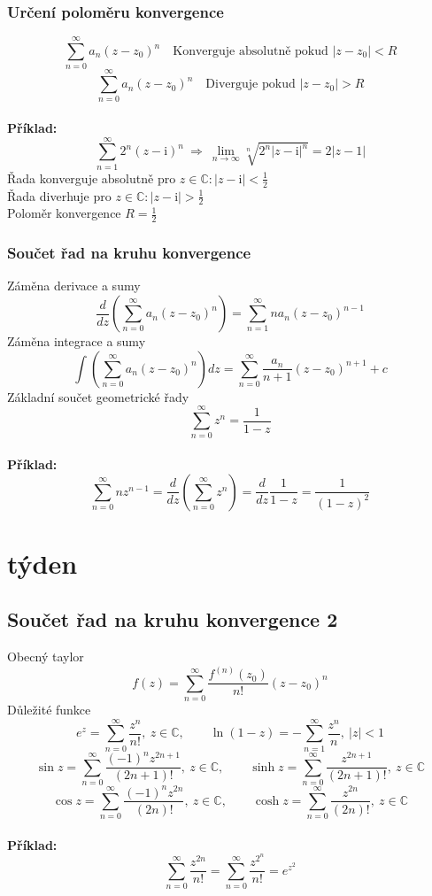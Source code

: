\documentclass{article}
\newcommand{\mi}{\mathrm{i}}
\begin{document}
            \subsubsection*{Určení poloměru konvergence}
            \[\sum_{n=0}^\infty a_n(z-z_0)^n\quad \mbox{Konverguje absolutně pokud }|z-z_0|<R\]
            \[\sum_{n=0}^\infty a_n(z-z_0)^n\quad \mbox{Diverguje pokud }|z-z_0|>R\]
            \\
            {\bf Příklad:}
            \[\sum_{n=1}^{\infty}2^n(z-\mi)^n\:\Rightarrow\:\lim_{n\to\infty}\sqrt[n]{2^n|z-\mi|^n}
            =2|z-1|\]
            Řada konverguje absolutně pro $z\in\mathbb{C}:|z-\mi|<\frac{1}{2}$\\
            Řada diverhuje pro $z\in\mathbb{C}:|z-\mi|>\frac{1}{2}$\\
            Poloměr konvergence $R=\frac{1}{2}$
            \subsubsection*{Součet řad na kruhu konvergence}
                Záměna derivace a sumy
                    \[\frac{d}{dz}\left(\sum_{n=0}^\infty a_n(z-z_0)^n\right)=
                    \sum_{n=1}^\infty na_n(z-z_0)^{n-1}\]
                Záměna integrace a sumy
                    \[\int \left(\sum_{n=0}^{\infty}a_n(z-z_0)^n\right)dz=
                    \sum_{n=0}^{\infty}\frac{a_n}{n+1}(z-z_0)^{n+1}+c\]
                Základní součet geometrické řady
                    \[\sum_{n=0}^{\infty}z^n=\frac{1}{1-z}\]
                \\
                {\bf Příklad:}
                \[\sum_{n=0}^{\infty}nz^{n-1}=
                \frac{d}{dz}\left(\sum_{n=0}^{\infty}z^{n}\right)=
                \frac{d}{dz}\frac{1}{1-z}=\frac{1}{(1-z)^2}\]


    \section{týden}
        \subsection{Součet řad na kruhu konvergence 2}
            Obecný taylor
                \[f(z)=\sum_{n=0}^{\infty}\frac{f^{(n)}(z_0)}{n!}(z-z_0)^n\]
            Důležité funkce
                \[e^z=\sum_{n=0}^{\infty}\frac{z^n}{n!},\:z\in\mathbb{C},\qquad
                \ln(1-z)=-\sum_{n=1}^{\infty}\frac{z^n}{n},\:|z|<1\]
                \[\sin z =\sum_{n=0}^{\infty}\frac{(-1)^nz^{2n+1}}{(2n+1)!},\:z\in\mathbb{C},\qquad
                \sinh z =\sum_{n=0}^{\infty}\frac{z^{2n+1}}{(2n+1)!},\:z\in\mathbb{C}\]
                \[\cos z =\sum_{n=0}^{\infty}\frac{(-1)^nz^{2n}}{(2n)!},\:z\in\mathbb{C},\qquad
                \cosh z =\sum_{n=0}^{\infty}\frac{z^{2n}}{(2n)!},\:z\in\mathbb{C}\]
                \\
                {\bf Příklad:}
                \[\sum_{n=0}^{\infty}\frac{z^{2n}}{n!}=
                \sum_{n=0}^{\infty}\frac{z^{2^{n}}}{n!}=e^{z^2}\]
\end{document}
